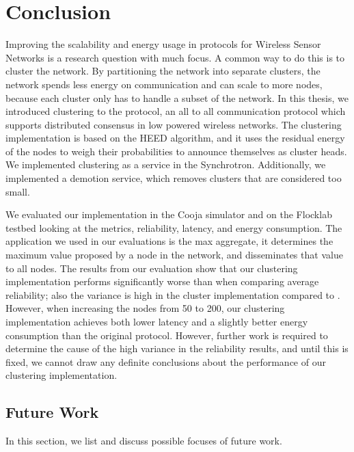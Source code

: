 \chapter{Conclusion}
\label{chap:conclusion}

Improving the scalability and energy usage in protocols for Wireless Sensor Networks is a research question with much focus. A common way to do this is to cluster the network. By partitioning the network into separate clusters, the network spends less energy on communication and can scale to more nodes, because each cluster only has to handle a subset of the network. In this thesis, we introduced clustering to the \atwo{} protocol, an all to all communication protocol which supports distributed consensus in low powered wireless networks. The clustering implementation is based on the HEED algorithm, and it uses the residual energy of the nodes to weigh their probabilities to announce themselves as cluster heads. We implemented clustering as a service in the \atwo{} Synchrotron. Additionally, we implemented a demotion service, which removes clusters that are considered too small.

We evaluated our implementation in the Cooja simulator and on the Flocklab testbed looking at the metrics, reliability, latency, and energy consumption. The application we used in our evaluations is the max aggregate, it determines the maximum value proposed by a node in the network, and disseminates that value to all nodes. The results from our evaluation show that our clustering implementation performs significantly worse than \atwo{} when comparing average reliability; also the variance is high in the cluster implementation compared to \atwo{}. However, when increasing the nodes from 50 to 200, our clustering implementation achieves both lower latency and a slightly better energy consumption than the original \atwo{} protocol. However, further work is required to determine the cause of the high variance in the reliability results, and until this is fixed, we cannot draw any definite conclusions about the performance of our clustering implementation.

\section{Future Work}
\label{sec:future-work}
In this section, we list and discuss possible focuses of future work.


